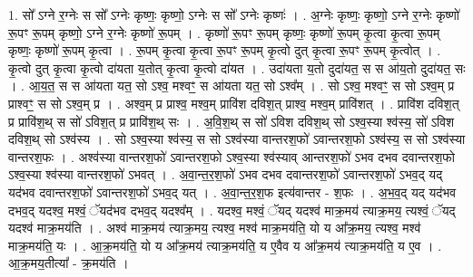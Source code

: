 \documentclass[17pt]{extarticle}
\begin{document}
1. सो᳚ ऽग्ने र॒ग्नेः स सो᳚ ऽग्नेः कृष्णः॒ कृष्णो॒ ऽग्नेः स सो᳚ ऽग्नेः कृष्णः॑ । . अ॒ग्नेः कृष्णः॒ कृष्णो॒ ऽग्ने र॒ग्नेः कृष्णो॑ रू॒पꣳ रू॒पम् कृष्णो॒ ऽग्ने र॒ग्नेः कृष्णो॑ रू॒पम् । . कृष्णो॑ रू॒पꣳ रू॒पम् कृष्णः॒ कृष्णो॑ रू॒पम् कृ॒त्वा कृ॒त्वा रू॒पम् कृष्णः॒ कृष्णो॑ रू॒पम् कृ॒त्वा । . रू॒पम् कृ॒त्वा कृ॒त्वा रू॒पꣳ रू॒पम् कृ॒त्वो दुत् कृ॒त्वा रू॒पꣳ रू॒पम् कृ॒त्वोत् । . कृ॒त्वो दुत् कृ॒त्वा कृ॒त्वो दा॑यता य॒तोत् कृ॒त्वा कृ॒त्वो दा॑यत । . उदा॑यता य॒तो दुदा॑यत॒ स स आ॑य॒तो दुदा॑यत॒ सः । . आ॒य॒त॒ स स आ॑यता यत॒ सो ऽश्व॒ मश्वꣳ॒॒ स आ॑यता यत॒ सो ऽश्व᳚म् । . सो ऽश्व॒ मश्वꣳ॒॒ स सो ऽश्व॒म् प्र प्राश्वꣳ॒॒ स सो ऽश्व॒म् प्र । . अश्व॒म् प्र प्राश्व॒ मश्व॒म् प्रावि॑श दविश॒त् प्राश्व॒ मश्व॒म् प्रावि॑शत् । . प्रावि॑श दविश॒त् प्र प्रावि॑श॒थ् स सो॑ ऽविश॒त् प्र प्रावि॑श॒थ् सः । . अ॒वि॒श॒थ् स सो॑ ऽविश दविश॒थ् सो ऽश्व॒स्या श्व॑स्य॒ सो॑ ऽविश दविश॒थ् सो ऽश्व॑स्य । . सो ऽश्व॒स्या श्व॑स्य॒ स सो ऽश्व॑स्या वान्तरश॒फो॑ ऽवान्तरश॒फो ऽश्व॑स्य॒ स सो ऽश्व॑स्या वान्तरश॒फः । . अश्व॑स्या वान्तरश॒फो॑ ऽवान्तरश॒फो ऽश्व॒स्या श्व॑स्याव् आन्तरश॒फो॑ ऽभव दभव दवान्तरश॒फो ऽश्व॒स्या श्व॑स्या वान्तरश॒फो॑ ऽभवत् । . अ॒वा॒न्त॒र॒श॒फो॑ ऽभव दभव दवान्तरश॒फो॑ ऽवान्तरश॒फो॑ ऽभव॒द् यद् यद॑भव दवान्तरश॒फो॑ ऽवान्तरश॒फो॑ ऽभव॒द् यत् । . अ॒वा॒न्त॒र॒श॒फ इत्य॑वान्तर - श॒फः । . अ॒भ॒व॒द् यद् यद॑भव दभव॒द् यदश्व॒ मश्वं॒ ॅयद॑भव दभव॒द् यदश्व᳚म् । . यदश्व॒ मश्वं॒ ॅयद् यदश्व॑ माक्र॒मय॑ त्याक्र॒मय॒ त्यश्वं॒ ॅयद् यदश्व॑ माक्र॒मय॑ति । . अश्व॑ माक्र॒मय॑ त्याक्र॒मय॒ त्यश्व॒ मश्व॑ माक्र॒मय॑ति॒ यो य आ᳚क्र॒मय॒ त्यश्व॒ मश्व॑ माक्र॒मय॑ति॒ यः । . आ॒क्र॒मय॑ति॒ यो य आ᳚क्र॒मय॑ त्याक्र॒मय॑ति॒ य ए॒वैव य आ᳚क्र॒मय॑ त्याक्र॒मय॑ति॒ य ए॒व । . आ॒क्र॒मय॒तीत्या᳚ - क्र॒मय॑ति । \newline
\end{document}
